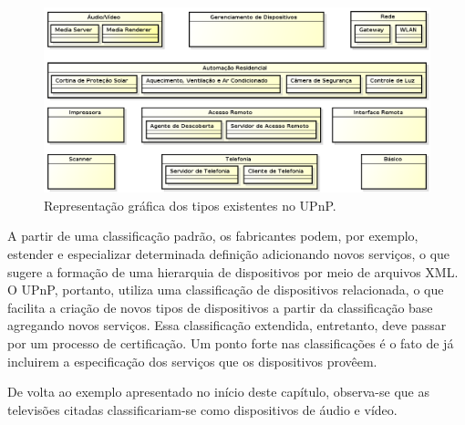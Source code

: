 \begin{figure}[ht]
\center
\includegraphics[scale=0.49]{imagens/recursosUPnP}
\caption{Representação gráfica dos tipos existentes no UPnP.}
\label{fig:ddlspec}
\end{figure}

A partir de uma classificação padrão, os fabricantes podem, por exemplo, estender e especializar determinada definição adicionando novos serviços, o que sugere a formação de uma hierarquia de dispositivos por meio de arquivos XML. O UPnP, portanto, utiliza uma classificação de dispositivos relacionada, o que facilita a criação de novos tipos de dispositivos a partir da classificação base agregando novos serviços. Essa classificação extendida, entretanto, deve passar por um processo de certificação. Um ponto forte nas classificações é o fato de já incluirem a especificação dos serviços que os dispositivos provêem.

De volta ao exemplo apresentado no início deste capítulo, observa-se que as televisões citadas classificariam-se como dispositivos de áudio e vídeo.